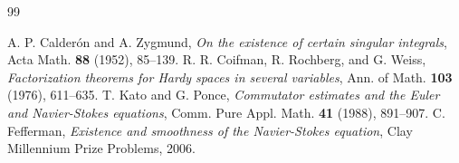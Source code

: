 \documentclass[11pt,a4paper]{article}
\theoremstyle{definition}
\begin{document}
\begin{thebibliography}{99}

 A. P. Calder\'on and A. Zygmund, \emph{On the existence of certain singular integrals}, Acta Math. \textbf{88} (1952), 85--139.
 R. R. Coifman, R. Rochberg, and G. Weiss, \emph{Factorization theorems for Hardy spaces in several variables}, Ann. of Math. \textbf{103} (1976), 611--635.
 T. Kato and G. Ponce, \emph{Commutator estimates and the Euler and Navier-Stokes equations}, Comm. Pure Appl. Math. \textbf{41} (1988), 891--907.
 C. Fefferman, \emph{Existence and smoothness of the Navier-Stokes equation}, Clay Millennium Prize Problems, 2006.

\end{thebibliography}
\end{document}
